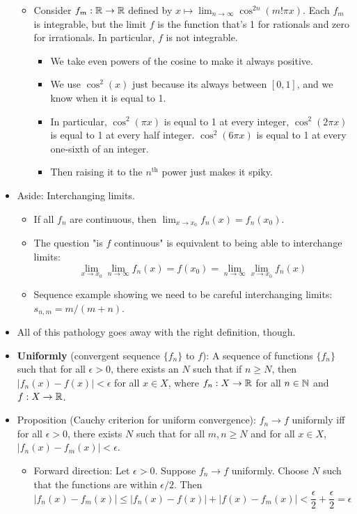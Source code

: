 \documentclass[../notes.tex]{subfiles}
\begin{document}
\begin{itemize}
\begin{itemize}
        \item Consider $f_m:\mathbb{R}\to\mathbb{R}$ defined by $x\mapsto\lim_{n\to\infty}\cos^{2n}(m!\pi x)$. Each $f_m$ is integrable, but the limit $f$ is the function that's 1 for rationals and zero for irrationals. In particular, $f$ is not integrable.
        \begin{itemize}
            \item We take even powers of the cosine to make it always positive.
            \item We use $\cos^2(x)$ just because its always between $[0,1]$, and we know when it is equal to 1.
            \item In particular, $\cos^2(\pi x)$ is equal to 1 at every integer, $\cos^2(2\pi x)$ is equal to 1 at every half integer. $\cos^2(6\pi x)$ is equal to 1 at every one-sixth of an integer.
            \item Then raising it to the $n^\text{th}$ power just makes it spiky.
        \end{itemize}
    \end{itemize}
    \item Aside: Interchanging limits.
    \begin{itemize}
        \item If all $f_n$ are continuous, then $\lim_{x\to x_0}f_n(x)=f_n(x_0)$.
        \item The question "is $f$ continuous" is equivalent to being able to interchange limits:
        \begin{equation*}
            \lim_{x\to x_0}\lim_{n\to\infty}f_n(x) = f(x_0) = \lim_{n\to\infty}\lim_{x\to x_0}f_n(x)
        \end{equation*}
        \item Sequence example showing we need to be careful interchanging limits: $s_{n,m}=m/(m+n)$.
    \end{itemize}
    \item All of this pathology goes away with the right definition, though.
    \item \textbf{Uniformly} (convergent sequence $\{f_n\}$ to $f$): A sequence of functions $\{f_n\}$ such that for all $\epsilon>0$, there exists an $N$ such that if $n\geq N$, then $|f_n(x)-f(x)|<\epsilon$ for all $x\in X$, where $f_n:X\to\mathbb{R}$ for all $n\in\mathbb{N}$ and $f:X\to\mathbb{R}$.
    \item Proposition (Cauchy criterion for uniform convergence): $f_n\to f$ uniformly iff for all $\epsilon>0$, there exists $N$ such that for all $m,n\geq N$ and for all $x\in X$, $|f_n(x)-f_m(x)|<\epsilon$.
    \begin{itemize}
        \item Forward direction: Let $\epsilon>0$. Suppose $f_n\to f$ uniformly. Choose $N$ such that the functions are within $\epsilon/2$. Then
        \begin{equation*}
            |f_n(x)-f_m(x)| \leq |f_n(x)-f(x)|+|f(x)-f_m(x)| < \frac{\epsilon}{2}+\frac{\epsilon}{2} = \epsilon
        \end{equation*}
    \end{itemize}
\end{itemize}
\end{document}
